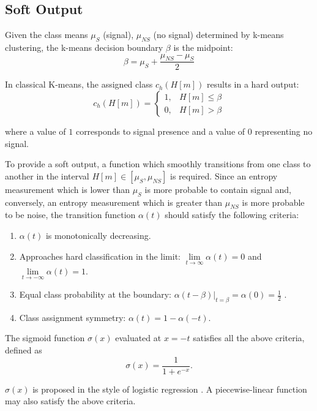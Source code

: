 \subsection{Soft Output}\label{sec:softoutput}

Given the class means $\mu_S$ (signal), $\mu_{NS}$ (no signal) determined by k-means clustering, the k-means decision boundary $\beta$ is the midpoint:
\begin{equation*}
	\beta = \mu_S + \frac{\mu_{NS} - \mu_S}{2}
\end{equation*}

In classical K-means, the assigned class $c_h(H[m])$ results in a hard output:
\begin{equation*}
	c_h(H[m]) = \begin{cases}
		1, & H[m] \leq \beta \\
		0, & H[m] > \beta
	\end{cases}
\end{equation*}

\noindent where a value of $1$ corresponds to signal presence and a value of $0$ representing no signal.

To provide a soft output, a function which smoothly transitions from one class to another in the interval $H[m] \in [\mu_S, \mu_{NS}]$ is required. Since an entropy measurement which is lower than $\mu_S$ is more probable to contain signal and, conversely, an entropy measurement which is greater than $\mu_{NS}$ is more probable to be noise, the transition function $\alpha(t)$ should satisfy the following criteria:
\begin{enumerate}
	\item  $\alpha(t)$ is monotonically decreasing.
	\item Approaches hard classification in the limit: $\lim\limits_{t \rightarrow \infty} \alpha(t) = 0$ and $\lim\limits_{t \rightarrow -\infty} \alpha(t) = 1$.
	\item Equal class probability at the boundary: $\alpha(t - \beta) |_{t=\beta} = \alpha(0) =  \frac{1}{2}$ .
	\item Class assignment symmetry: $\alpha(t) = 1 - \alpha(-t)$.
\end{enumerate}

The sigmoid function $\sigma(x)$ evaluated at $x = -t$ satisfies all the above criteria, defined as
\begin{equation*}
	\sigma(x) = \frac{1}{1 + e^{-x}}.
\end{equation*}

$\sigma(x)$ is proposed in the style of logistic regression \citep{logit}. A piecewise-linear function may also satisfy the above criteria.

